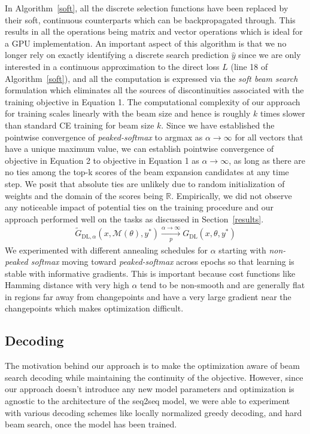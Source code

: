 \documentclass[letterpaper]{article} %
\begin{document}
In Algorithm~\ref{soft}, all the discrete selection functions have been replaced by their soft, continuous counterparts which can be backpropagated through. This results in all the operations being matrix and vector operations which is ideal for a GPU implementation. An important aspect of this algorithm is that we no longer rely on exactly identifying a discrete search prediction $\hat{y}$ since we are only interested in a continuous approximation to the direct loss $L$ (line 18 of Algorithm~\ref{soft}), and all the computation is expressed via the \emph{soft beam search} formulation which eliminates all the sources of discontinuities associated with the training objective in Equation 1. The computational complexity of our approach for training scales linearly with the beam size and hence is roughly $k$ times slower than standard CE training for beam size $k$.
Since we have established the pointwise convergence of \emph{peaked-softmax} to argmax as $\alpha \to \infty$ for all vectors that have a unique maximum value, we can establish pointwise convergence of objective in Equation 2 to objective in Equation 1 as $\alpha \to \infty$, as long as there are no ties among the top-k scores of the beam expansion candidates at any time step. We posit that absolute ties are unlikely due to random initialization of weights and the domain of the scores being $\mathbb{R}$. Empirically, we did not observe any noticeable impact of potential ties on the training procedure and our approach performed well on the tasks as discussed in Section~\ref{results}.
\begin{align}
\tilde{G}_{\textrm{DL},\alpha}(x, \mathcal{M}(\theta), y^*) \xrightarrow[\textit{p}]{\alpha \to \infty} G_{\textrm{DL}}(x,\theta, y^*)
\end{align}
We experimented with different annealing schedules for $\alpha$ starting with \emph{non-peaked softmax} moving toward \emph{peaked-softmax} across epochs so that learning is stable with informative gradients. This is important because cost functions like Hamming distance with very high $\alpha$ tend to be non-smooth and are generally flat in regions far away from changepoints and have a very large gradient near the changepoints which makes optimization difficult.

\subsection{Decoding \label{decoding}}
The motivation behind our approach is to make the optimization aware of beam search decoding while maintaining the continuity of the objective. However, since our approach doesn't introduce any new model parameters and optimization is agnostic to the architecture of the seq2seq model, we were able to experiment with various decoding schemes like locally normalized greedy decoding, and hard beam search, once the model has been trained.
\end{document}
